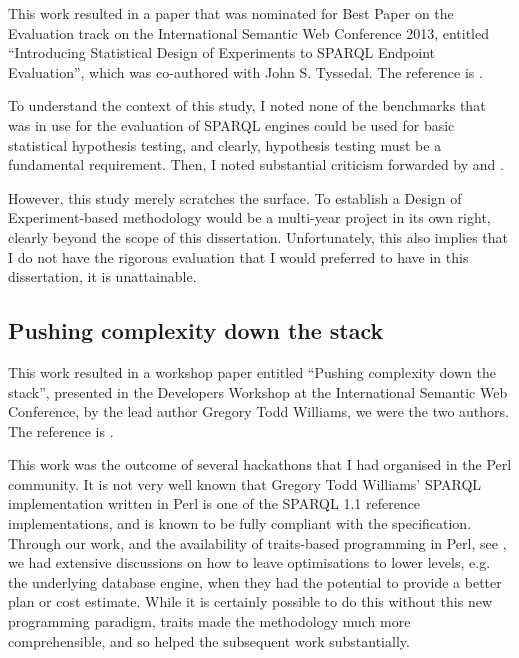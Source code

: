 This work resulted in a paper that was nominated for Best Paper on the
Evaluation track on the International Semantic Web Conference 2013,
entitled ``Introducing Statistical Design of Experiments to SPARQL
Endpoint Evaluation'', which was co-authored with John
S. Tyssedal. The reference is \cite{kjernsmo_doe_intro}.

To understand the context of this study, I noted none of the
benchmarks that was in use for the evaluation of SPARQL engines could
be used for basic statistical hypothesis testing, and clearly,
hypothesis testing must be a fundamental requirement. Then, I noted
substantial criticism forwarded by
\cite{Duan:2011:AOC:1989323.1989340} and \cite{MontoyaVCRA12}.

However, this study merely scratches the surface. To establish a
Design of Experiment-based methodology would be a multi-year project
in its own right, clearly beyond the scope of this
dissertation. Unfortunately, this also implies that I do not have the
rigorous evaluation that I would preferred to have in this
dissertation, it is unattainable.

\subsection{Pushing complexity down the stack}\label{sec:conpush}

This work resulted in a workshop paper entitled ``Pushing complexity
down the stack'', presented in the Developers Workshop at the
International Semantic Web Conference, by the lead author Gregory Todd
Williams, we were the two authors. The reference is
\cite{williamspushing}.


This work was the outcome of several hackathons that I had organised
in the Perl community. It is not very well known that Gregory Todd
Williams' SPARQL implementation written in Perl is one of the SPARQL
1.1 reference implementations, and is known to be fully compliant with
the specification. Through our work, and the availability of
traits-based programming in Perl, see \cite{traits}, we had extensive
discussions on how to leave optimisations to lower levels, e.g. the
underlying database engine, when they had the potential to provide a
better plan or cost estimate. While it is certainly possible to do
this without this new programming paradigm, traits made the
methodology much more comprehensible, and so helped the subsequent
work substantially.

